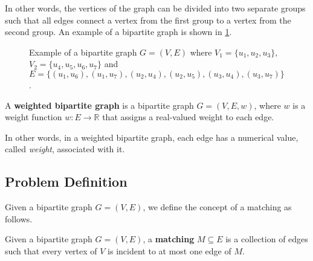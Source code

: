 In other words, the vertices of the graph can be divided into two separate groups such that all edges connect a vertex from the first group to a vertex from the second group. An example of a bipartite graph is shown in \cref{fig:bipartite_graph_example}.

\begin{figure}[H]
    \centering
    \caption[Example of a bipartite graph]{Example of a bipartite graph $G=(V, E)$ where $V_1=\{u_1,u_2,u_3\}$, $V_2=\{u_4,u_5,u_6,u_7\}$ and $E=\{(u_1,u_6),(u_1,u_7),(u_2,u_4),(u_2,u_5),(u_3,u_4),(u_3,u_7)\}$.}
    \label{fig:bipartite_graph_example}
\end{figure}

\begin{definition} \label{def:weighted_bipartite}
    A \textbf{weighted bipartite graph} is a bipartite graph $G=(V, E, w)$, where $w$ is a weight function $w: E \to \mathbb{R}$ that assigns a real-valued weight to each edge.
\end{definition}

In other words, in a weighted bipartite graph, each edge has a numerical value, called \emph{weight}, associated with it.

\subsection{Problem Definition}
Given a bipartite graph $G = (V, E)$, we define the concept of a matching as follows.

\begin{definition}[Matching] \label{def:matching}
    Given a bipartite graph $G = (V, E)$, a \textbf{matching} $M \subseteq E$ is a collection of edges such that every vertex of $V$ is incident to at most one edge of $M$.
\end{definition}


